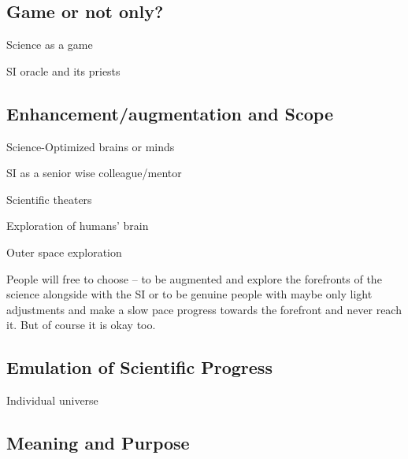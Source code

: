\documentclass[a4paper,11pt]{article}
\begin{document}
        \subsection{Game or not only?}

        Science as a game

        SI oracle and its priests

        \subsection{Enhancement/augmentation and Scope}

        Science-Optimized brains or minds

        SI as a senior wise colleague/mentor

        Scientific theaters

        Exploration of humans' brain

        Outer space exploration

        People will free to choose -- to be augmented and explore the forefronts of the science alongside with the SI or to be genuine people with maybe only light adjustments and make a slow pace progress towards the forefront and never reach it. But of course it is okay too.

        \subsection{Emulation of Scientific Progress}

        Individual universe

        \subsection{Meaning and Purpose}






\printbibliography
\end{document}
